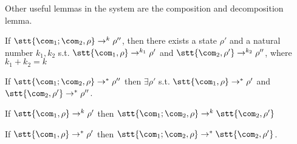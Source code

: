 \noindent
Other useful lemmas in the system are the composition and
decomposition lemma.

\begin{lemma}\label{le:decomp}
  If \(\stt{\com_1;\com_2, \rho} \to^k \rho''\), then there exists a
  state \(\rho'\) and a natural number \(k_1, k_2\)
  s.t. \(\stt{\com_1, \rho} \to^{k_1} \rho'\) and
  \(\stt{\com_2, \rho'} \to^{k_2}\rho''\), where \(k_1 + k_2 = k\)
\end{lemma}

\begin{corollary}\label{co:decomp}
  If \(\stt{\com_1;\com_2, \rho} \to^* \rho''\) then \(\exists \rho'\)
  s.t. \(\stt{\com_1, \rho} \to^* \rho'\) and
  \(\stt{\com_2, \rho'}\to^* \rho''\).
\end{corollary}

\begin{lemma}\label{le:comp}
  If \(\stt{\com_1, \rho} \to^k \rho'\) then
  \(\stt{\com_1; \com_2, \rho} \to^k \stt{\com_2, \rho'}\)
\end{lemma}

\begin{corollary}\label{co:comp}
  If \(\stt{\com_1, \rho} \to^* \rho'\) then
  \(\stt{\com_1;\com_2, \rho}\to^* \stt{\com_2, \rho'}\).
\end{corollary}


